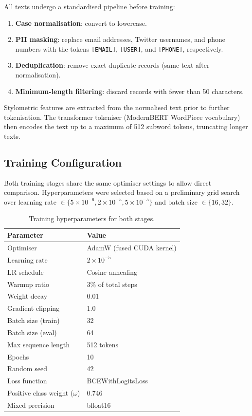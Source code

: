 All texts undergo a standardised pipeline before training:
\begin{enumerate}
  \item \textbf{Case normalisation}: convert to lowercase.
  \item \textbf{PII masking}: replace email addresses, Twitter usernames, and phone numbers with the tokens \texttt{[EMAIL]}, \texttt{[USER]}, and \texttt{[PHONE]}, respectively.
  \item \textbf{Deduplication}: remove exact-duplicate records (same text after normalisation).
  \item \textbf{Minimum-length filtering}: discard records with fewer than 50 characters.
\end{enumerate}

Stylometric features are extracted from the normalised text prior to further tokenisation. The transformer tokeniser (ModernBERT WordPiece vocabulary) then encodes the text up to a maximum of 512 subword tokens, truncating longer texts.

\subsection{Training Configuration}

Both training stages share the same optimiser settings to allow direct comparison. Hyperparameters were selected based on a preliminary grid search over learning rate $\in \{5\times 10^{-6}, 2\times 10^{-5}, 5\times 10^{-5}\}$ and batch size $\in \{16, 32\}$.

\begin{table}[htbp]
  \centering
  \caption{Training hyperparameters for both stages.}
  \label{tab:hyperparams}
  \begin{tabular}{ll}
    \toprule
    \textbf{Parameter} & \textbf{Value} \\
    \midrule
    Optimiser           & AdamW (fused CUDA kernel) \\
    Learning rate       & $2 \times 10^{-5}$ \\
    LR schedule         & Cosine annealing \\
    Warmup ratio        & 3\% of total steps \\
    Weight decay        & 0.01 \\
    Gradient clipping   & 1.0 \\
    Batch size (train)  & 32 \\
    Batch size (eval)   & 64 \\
    Max sequence length & 512 tokens \\
    Epochs              & 10 \\
    Random seed         & 42 \\
    Loss function       & BCEWithLogitsLoss \\
    Positive class weight ($\omega$) & 0.746 \\
    Mixed precision     & bfloat16 \\
    \bottomrule
  \end{tabular}
\end{table}

